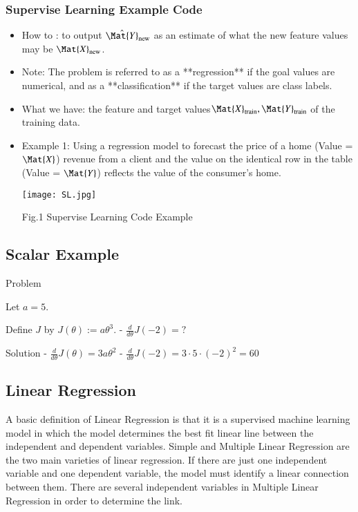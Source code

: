 \documentclass[10pt]{aa}
\begin{document}
\subsubsection{Supervise Learning Example Code}
%
   \begin{itemize}
\item How to : to output ${\hat{\Mat{Y}}_\mathrm{new}}$ as an estimate of what the new feature values may be ${\Mat{X}_\mathrm{new}}$.
\item Note: The problem is referred to as a **regression** if the goal values are numerical, and as a **classification** if the target values are class labels.
\item What we have: the feature and target values${\Mat{X}_\mathrm{train}}, {\Mat{Y}_\mathrm{train}}$ of the training data.
\item Example 1: Using a regression model to forecast the price of a home (Value = $\Mat{X}$) revenue from a client and the value on the identical row in the table (Value = $\Mat{Y}$) reflects the value of the consumer's home.

   \texttt{[image: SL.jpg]}
   \caption{Fig.1 Supervise Learning Code Example}
   \label{FigVibStab}
   \end{itemize}
\endsubsection

\subsection{Scalar Example}
Problem

Let $a = 5$. 

Define $J$ by $J(\theta) := a \theta^3$.
- $\frac{d}{d\theta} J(-2)=?$

Solution
- $\frac{d}{d\theta} J(\theta)=3 a \theta^2$
- $\frac{d}{d\theta} J(-2)= 3 \cdot 5 \cdot (-2)^2 = 60$

\subsection{Linear Regression}
A basic definition of Linear Regression is that it is a supervised machine learning model in which the model determines the best fit linear line between the independent and dependent variables. Simple and Multiple Linear Regression are the two main varieties of linear regression. If there are just one independent variable and one dependent variable, the model must identify a linear connection between them. There are several independent variables in Multiple Linear Regression in order to determine the link.
\end{document}
